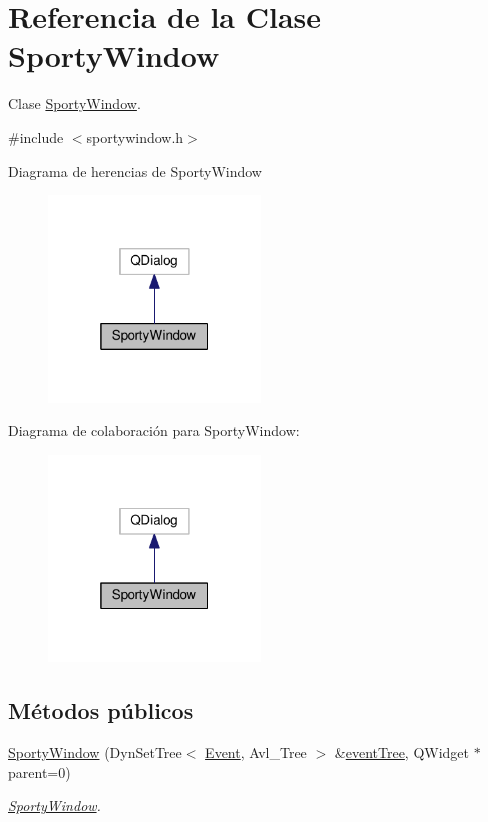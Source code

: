 \hypertarget{class_sporty_window}{}\section{Referencia de la Clase Sporty\+Window}
\label{class_sporty_window}


Clase \hyperlink{class_sporty_window}{Sporty\+Window}.  




{\ttfamily \#include $<$sportywindow.\+h$>$}



Diagrama de herencias de Sporty\+Window\nopagebreak
\begin{figure}[H]
\begin{center}
\leavevmode
\includegraphics[width=160pt]{class_sporty_window__inherit__graph}
\end{center}
\end{figure}


Diagrama de colaboración para Sporty\+Window\+:\nopagebreak
\begin{figure}[H]
\begin{center}
\leavevmode
\includegraphics[width=160pt]{class_sporty_window__coll__graph}
\end{center}
\end{figure}
\subsection*{Métodos públicos}
\begin{DoxyCompactItemize}
\item 
\hyperlink{class_sporty_window_aa6648488a2edf18678b39156fbf43d63}{Sporty\+Window} (Dyn\+Set\+Tree$<$ \hyperlink{class_event}{Event}, Avl\+\_\+\+Tree $>$ \&\hyperlink{class_sporty_window_ae5042630126b218d12b7f7b9b92c4307}{event\+Tree}, Q\+Widget $\ast$parent=0)
\begin{DoxyCompactList}\small\item\em \hyperlink{class_sporty_window}{Sporty\+Window}. \end{DoxyCompactList}\end{DoxyCompactItemize}
